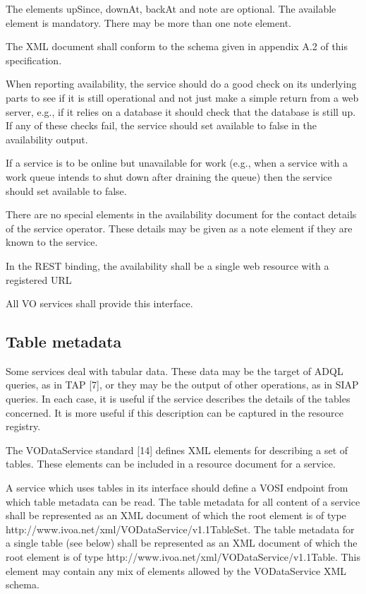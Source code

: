 \documentclass[11pt,letter]{ivoa}
\begin{document}
The elements upSince, downAt, backAt and note are optional. The available element is mandatory. There may be more than one note element.

The XML document shall conform to the schema given in appendix A.2 of this specification.

When reporting availability, the service should do a good check on its underlying parts to see if it is still operational and not just make a simple return from a web server, e.g., if it relies on a database it should check that the database is still up. If any of these checks fail, the service should set available to false in the availability output.

If a service is to be online but unavailable for work (e.g., when a service with a work queue intends to shut down after draining the queue) then the service should set available to false.

There are no special elements in the availability document for the contact details of the service operator. These details may be given as a note element if they are known to the service.

In the REST binding, the availability shall be a single web resource with a registered URL

All VO services shall provide this interface. 

\subsection{Table metadata}

 Some services deal with tabular data. These data may be the target of ADQL queries, as in TAP [7], or they may be the output of other operations, as in SIAP queries. In each case, it is useful if the service describes the details of the tables concerned. It is more useful if this description can be captured in the resource registry.

The VODataService standard [14] defines XML elements for describing a set of tables. These elements can be included in a resource document for a service.

A service which uses tables in its interface should define a VOSI endpoint from which table metadata can be read. The table metadata for all content of a service shall be represented as an XML document of which the root element is of type 
{http://www.ivoa.net/xml/VODataService/v1.1}TableSet. The table metadata for a single table (see below) shall be represented as an
XML document of which the root element is of type {http://www.ivoa.net/xml/VODataService/v1.1}Table. This element may contain any mix of elements allowed by the VODataService XML schema.
\end{document}
